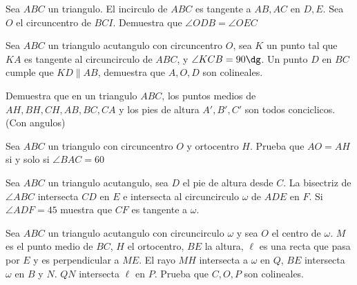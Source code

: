\documentclass[11pt]{scrartcl}
\newcommand{\gad}{\textcolor{yellow}{$\bigstar$}}
\newcommand{\thmdifficulty}{0}
\newcommand{\problemdiff}[1]{\renewcommand{\thmdifficulty}{#1}}
\begin{document}
\problemdiff{3}
\begin{problem}
    Sea $ABC$ un triangulo. El incirculo de $ABC$ es tangente a $AB, AC$ en $D,E$. Sea $O$ el circuncentro de $BCI$. Demuestra que $\angle ODB=\angle OEC$
\end{problem}

\problemdiff{3.5}
\begin{problem}
    Sea $ABC$ un triangulo acutangulo con circuncentro $O$, sea $K$ un punto tal que $KA$ es tangente al circuncirculo de $ABC$, y $\angle KCB=90\dg$. Un punto $D$ en $BC$
    cumple que $KD \parallel AB$, demuestra que $A,O,D$ son colineales.
\end{problem}

\problemdiff{3.5}
\begin{problem} [9 puntos]
    Demuestra que en un triangulo $ABC$, los puntos medios de $AH,BH,CH,AB,BC,CA$ y los pies de altura $A',B',C'$ son todos conciclicos. (Con angulos)
\end{problem}


\problemdiff{4}
\begin{problem} [OTIS]
Sea $ABC$ un triangulo con circuncentro $O$ y ortocentro $H$. Prueba que $AO=AH$ si y solo si $\angle BAC=60$
\end{problem}




\problemdiff{5}
\begin{problem} [\gad]
    Sea $ABC$ un triangulo acutangulo, sea $D$ el pie de altura desde $C$. La bisectriz de $\angle ABC$ intersecta $CD$ en $E$ e intersecta al circuncirculo $\omega$ de $ADE$ en $F$. Si $\angle ADF=45$ muestra que $CF$ es tangente a $\omega$.
\end{problem}

\problemdiff{5}
\begin{problem}[AoPS] %
    Sea $ABC$ un triangulo acutangulo con circuncirculo $\omega$ y sea $O$ el centro de $\omega$. $M$ es el punto medio de $BC$, $H$ el ortocentro, $BE$ la altura, $\ell$ es una recta que pasa por $E$
    y es perpendicular a $ME$. El rayo $MH$ intersecta a $\omega$ en $Q$, $BE$ intersecta $\omega$ en $B$ y $N$. $QN$ intersecta $\ell$ en $P$. Prueba que $C,O,P$ son colineales.
\end{problem}
\end{document}
